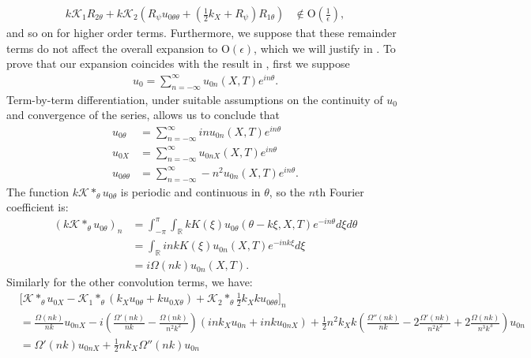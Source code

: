 \documentclass[11pt,leqno]{article}
\numberwithin{equation}{section}
\newcommand{\R}{\mathbb R}
\theoremstyle{definition}
\begin{document}
\begin{appendices}
	\begin{align*}
		k\mathcal{K}_{1}R_{2\theta} + k\mathcal{K}_{2}\left(R_{\psi}u_{0\theta\theta} + \left(\frac{1}{2}k_{X} + R_{\psi}\right)R_{1\theta}\right) &\notin \mathrm{O}\left(\frac{1}{\epsilon}\right),
	\end{align*}
	and so on for higher order terms. Furthermore, we suppose that these remainder terms do not affect the overall expansion to $ \mathrm{O}(\epsilon) $, which we will justify in . To prove that our expansion coincides with the result in \cite{BIHS2021}, first we suppose
	\begin{align*}
		u_{0} = \sum_{n=-\infty}^{\infty}u_{0n}(X,T)e^{in\theta}.
	\end{align*}
	Term-by-term differentiation, under suitable assumptions on the continuity of $ u_{0} $ and convergence of the series, allows us to conclude that
	\begin{align*}
		u_{0\theta} &= \sum_{n=-\infty}^{\infty}inu_{0n}(X,T)e^{in\theta}\\
		u_{0X} &= \sum_{n=-\infty}^{\infty}u_{0nX}(X,T)e^{in\theta}\\
		u_{0\theta\theta} &= \sum_{n=-\infty}^{\infty}-n^{2}u_{0n}(X,T)e^{in\theta}.
	\end{align*}
	The function $ k\mathcal{K}*_{\theta}u_{0\theta} $ is periodic and continuous in $ \theta $, so the $ n $th Fourier coefficient is:
	\begin{align*}
		(k\mathcal{K}*_{\theta}u_{0\theta})_{n} &= \int_{-\pi}^{\pi}\int_{\R}kK(\xi)u_{0\theta}(\theta - k\xi,X,T)e^{-in\theta}d\xi d\theta\\
		&= \int_{\R}inkK(\xi)u_{0n}(X,T)e^{-ink\xi}d\xi\\
		&= i\Omega(nk)u_{0n}(X,T).
	\end{align*}
	Similarly for the other convolution terms, we have:
	\begin{align*}
		&\bigg[\mathcal{K}*_{\theta}u_{0X} - \mathcal{K}_{1}*_{\theta}\left(k_{X}u_{0\theta} + ku_{0X\theta}\right) + \mathcal{K}_{2}*_{\theta}\frac{1}{2}k_{X}ku_{0\theta\theta}\bigg]_{n}\\
		&= \frac{\Omega(nk)}{nk}u_{0nX} - i\left(\frac{\Omega'(nk)}{nk} - \frac{\Omega(nk)}{n^{2}k^{2}}\right)\left(ink_{X}u_{0n} + inku_{0nX}\right) + \frac{1}{2}n^{2}k_{X}k\left(\frac{\Omega''(nk)}{nk} - 2\frac{\Omega'(nk)}{n^{2}k^{2}} + 2\frac{\Omega(nk)}{n^{3}k^{3}}\right)u_{0n}\\
		&= \Omega'(nk)u_{0nX} + \frac{1}{2}nk_{X}\Omega''(nk)u_{0n}\\

\end{align*}
\end{appendices}
\end{document}
